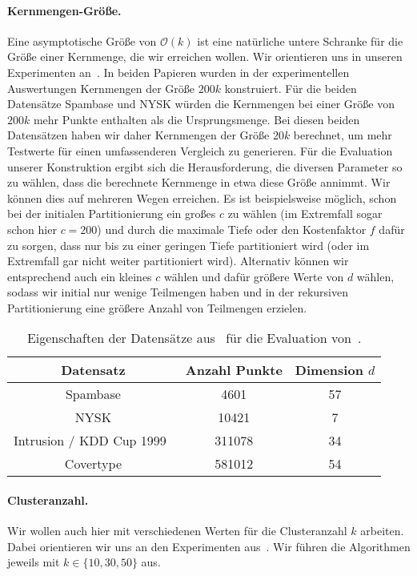 \paragraph{Kernmengen-Größe.}
Eine asymptotische Größe von $\mathcal{O}(k)$ ist eine natürliche untere Schranke für die Größe einer Kernmenge, die wir
erreichen wollen. Wir orientieren uns in unseren Experimenten an~\cite{AckermannMRSLS12,FichtenbergerGSSS13}. In beiden Papieren
wurden in der experimentellen Auswertungen Kernmengen der Größe $200k$ konstruiert. Für die beiden Datensätze Spambase und
NYSK würden die Kernmengen bei einer Größe von $200k$ mehr Punkte enthalten als die Ursprungsmenge. Bei diesen beiden Datensätzen
haben wir daher Kernmengen der Größe $20k$ berechnet, um mehr Testwerte für einen umfassenderen Vergleich zu generieren.
Für die Evaluation unserer Konstruktion
ergibt sich die Herausforderung, die diversen Parameter so zu wählen, dass die berechnete Kernmenge in etwa diese
Größe annimmt. Wir können dies auf mehreren Wegen erreichen. Es ist beispielsweise möglich, schon bei
der initialen Partitionierung ein großes $c$ zu wählen (im Extremfall sogar schon hier $c=200$) und durch die maximale Tiefe
oder den Kostenfaktor $f$ dafür zu sorgen, dass nur bis zu einer geringen Tiefe partitioniert wird (oder im Extremfall
gar nicht weiter partitioniert wird). Alternativ können wir entsprechend auch ein kleines $c$ wählen und dafür größere
Werte von $d$ wählen, sodass wir initial nur wenige Teilmengen haben und in der rekursiven Partitionierung eine größere
Anzahl von Teilmengen erzielen.

\begin{table}[t]
\centering
\begin{tabular}{@{}ccc@{}} \toprule
	\textbf{Datensatz} & \textbf{Anzahl Punkte} & \textbf{Dimension} $d$ \\ \midrule
	Spambase & 4601 & 57 \\
	NYSK & 10421  & 7 \\
	Intrusion / KDD Cup 1999~\cite{AckermannMRSLS12} & 311078 & 34 \\
	Covertype & 581012 & 54 \\ \bottomrule
\end{tabular}
\caption{Eigenschaften der Datensätze aus~\cite{Lichman13} für die Evaluation von~\CsTwo.}
\label{tbl:experiment-coresets-datasets}
\end{table}

\paragraph{Clusteranzahl.} Wir wollen auch hier mit verschiedenen Werten für die Clusteranzahl $k$ arbeiten.
Dabei orientieren wir uns an den Experimenten aus~\cite{AckermannMRSLS12,FichtenbergerGSSS13}. Wir führen die Algorithmen
jeweils mit $k \in \{ 10, 30, 50 \}$ aus.

